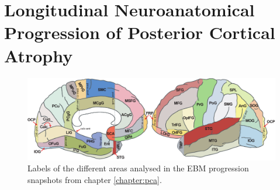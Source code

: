 
\chapter[Longitudinal Neuroanatomical Progression of PCA]{Longitudinal Neuroanatomical Progression of Posterior Cortical Atrophy}
\label{sec:adni_extra_appendix}


\newcommand*{\scaleLabelImg}{0.7}
\begin{figure}
  \centering
  \includegraphics*[scale=\scaleLabelImg]{images/Mid-Lateral_surface3-eps-converted-to.pdf}
  \caption[Labels of the different areas analysed in the EBM progression snapshots]{Labels of the different areas analysed in the EBM progression snapshots from chapter \ref{chapter:pca}. }
  \label{fig:ebmSnapLabels}
\end{figure}


